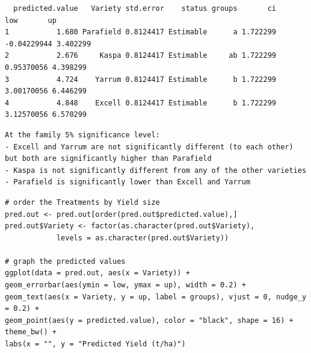 \documentclass[a4paper, 10pt, fleqn, twosided]{memoir}
\begin{document}
\begin{tcolorbox}[title = Example 3 Tukey's multiple comparison output]
\begin{verbatim}
  predicted.value   Variety std.error    status groups       ci         low       up
1           1.680 Parafield 0.8124417 Estimable      a 1.722299 -0.04229944 3.402299
2           2.676     Kaspa 0.8124417 Estimable     ab 1.722299  0.95370056 4.398299
3           4.724    Yarrum 0.8124417 Estimable      b 1.722299  3.00170056 6.446299
4           4.848    Excell 0.8124417 Estimable      b 1.722299  3.12570056 6.570299
\end{verbatim}
\end{tcolorbox}

\begin{tcolorbox}[title = Example 3 Prediction interpretation]
\begin{verbatim}
At the family 5% significance level:
- Excell and Yarrum are not significantly different (to each other)
but both are significantly higher than Parafield
- Kaspa is not significantly different from any of the other varieties
- Parafield is significantly lower than Excell and Yarrum
\end{verbatim}
\end{tcolorbox}
\begin{tcolorbox}[title = Example 3 Graph of predicted values]
\begin{verbatim}
# order the Treatments by Yield size
pred.out <- pred.out[order(pred.out$predicted.value),]
pred.out$Variety <- factor(as.character(pred.out$Variety),
            levels = as.character(pred.out$Variety))

# graph the predicted values 
ggplot(data = pred.out, aes(x = Variety)) +
geom_errorbar(aes(ymin = low, ymax = up), width = 0.2) +
geom_text(aes(x = Variety, y = up, label = groups), vjust = 0, nudge_y = 0.2) +
geom_point(aes(y = predicted.value), color = "black", shape = 16) + theme_bw() +
labs(x = "", y = "Predicted Yield (t/ha)")
\end{verbatim}
\end{tcolorbox}
\end{document}
